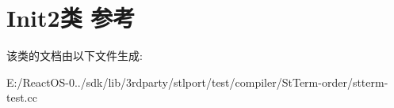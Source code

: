 \hypertarget{class_init2}{}\section{Init2类 参考}
\label{class_init2}


该类的文档由以下文件生成\+:\begin{DoxyCompactItemize}
\item 
E\+:/\+React\+O\+S-\/0../sdk/lib/3rdparty/stlport/test/compiler/\+St\+Term-\/order/stterm-\/test.\+cc\end{DoxyCompactItemize}
